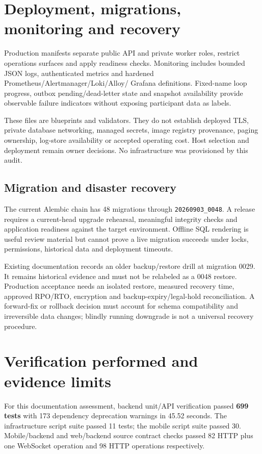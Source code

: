 \documentclass[11pt,a4paper]{article}
\newcommand{\src}[1]{{\small\nolinkurl{#1}}}
\begin{document}
\section{Deployment, migrations, monitoring and recovery}
Production manifests separate public API and private worker roles, restrict
operations surfaces and apply readiness checks. Monitoring includes bounded
JSON logs, authenticated metrics and hardened Prometheus/Alertmanager/Loki/Alloy/
Grafana definitions. Fixed-name loop progress, outbox pending/dead-letter state
and snapshot availability provide observable failure indicators without exposing
participant data as labels.

These files are blueprints and validators. They do not establish deployed TLS,
private database networking, managed secrets, image registry provenance, paging
ownership, log-store availability or accepted operating cost. Host selection and
deployment remain owner decisions. No infrastructure was provisioned by this audit.

\subsection{Migration and disaster recovery}
The current Alembic chain has 48 migrations through \src{20260903_0048}. A release
requires a current-head upgrade rehearsal, meaningful integrity checks and
application readiness against the target environment. Offline SQL rendering is
useful review material but cannot prove a live migration succeeds under locks,
permissions, historical data and deployment timeouts.

Existing documentation records an older backup/restore drill at migration 0029.
It remains historical evidence and must not be relabeled as a 0048 restore.
Production acceptance needs an isolated restore, measured recovery time,
approved RPO/RTO, encryption and backup-expiry/legal-hold reconciliation. A
forward-fix or rollback decision must account for schema compatibility and
irreversible data changes; blindly running downgrade is not a universal recovery
procedure.

\section{Verification performed and evidence limits}
For this documentation assessment, backend unit/API verification passed
\textbf{699 tests} with 173 dependency deprecation warnings in 45.52 seconds.
The infrastructure script suite passed 11 tests; the mobile script suite passed
30. Mobile/backend and web/backend source contract checks passed 82 HTTP plus
one WebSocket operation and 98 HTTP operations respectively.
\end{document}
